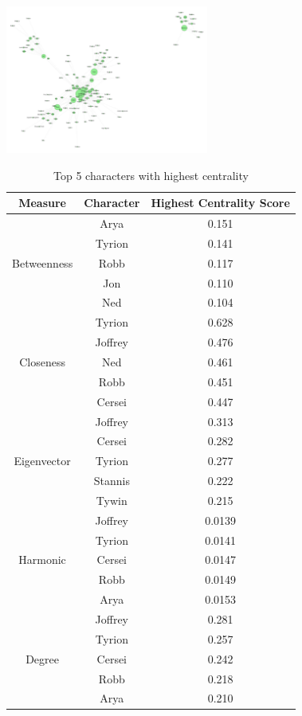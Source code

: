 \documentclass[10pt,twocolumn,letterpaper]{article}
\begin{document}
\begin{center}
    \includegraphics[width=0.5\textwidth]{img/s2/pagerank_network.jpg}
\end{center}

\begin{table}[]
    \centering
    \small
    \begin{tabular}{c|c|c}
        Measure & Character & \small{Highest Centrality Score}  \\
        \hline
                    & Arya & 0.151 \\
                    & Tyrion & 0.141 \\
        Betweenness & Robb & 0.117 \\
                    & Jon & 0.110 \\
                    & Ned & 0.104 \\
        \hline 
                    & Tyrion & 0.628 \\
                    & Joffrey & 0.476 \\
        Closeness   & Ned & 0.461 \\
                    & Robb & 0.451 \\
                    & Cersei & 0.447 \\
        \hline 
                    & Joffrey & 0.313 \\
                    & Cersei & 0.282 \\
        Eigenvector & Tyrion & 0.277 \\
                    & Stannis & 0.222 \\
                    & Tywin & 0.215 \\
        \hline 
                    & Joffrey & 0.0139 \\
                    & Tyrion & 0.0141 \\
        Harmonic    & Cersei & 0.0147 \\
                    & Robb & 0.0149 \\
                    & Arya & 0.0153 \\
        \hline            
                    & Joffrey & 0.281 \\
                    & Tyrion & 0.257 \\
        Degree      & Cersei & 0.242 \\
                    & Robb & 0.218 \\
                    & Arya & 0.210 \\
        \hline
    \end{tabular}
    \vspace{0.2cm}
    \caption{Top 5 characters with highest centrality}
    \label{tab:my_label}
\end{table} \\
\end{document}
